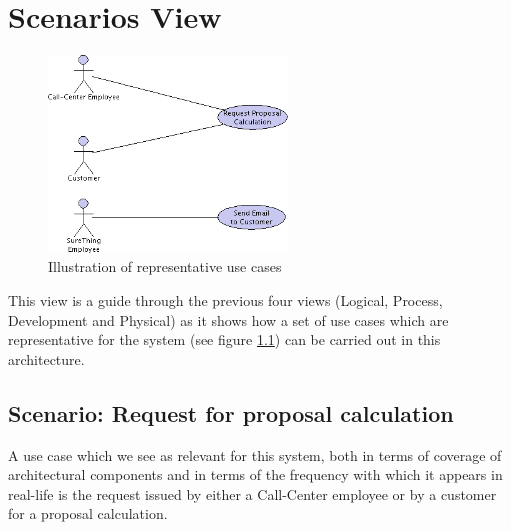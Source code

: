 \chapter{Scenarios View}

\begin{figure}[ht]
\begin{center}
\includegraphics[width=2.5in]{img/uc.png}
\end{center}
\caption{Illustration of representative use cases}
\label{fig:uc}
\end{figure}

This view is a guide through the previous four views (Logical, Process, Development and Physical)
as it shows how a set of use cases which are representative for the system (see figure \ref{fig:uc})
can be carried out in this architecture.

\section{Scenario: Request for proposal calculation}

A use case which we see as relevant for this system, both in terms of coverage of architectural
components and in terms of the frequency with which it appears in real-life is the request issued
by either a Call-Center employee or by a customer for a proposal calculation.

